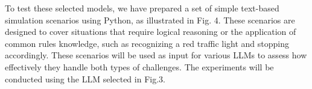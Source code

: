 \documentclass[conference]{IEEEtran}
\begin{document}
To test these selected models, we have prepared a set of simple text-based simulation scenarios using Python, as illustrated in Fig. 4. These scenarios are designed to cover situations that require logical reasoning or the application of common rules knowledge, such as recognizing a red traffic light and stopping accordingly. These scenarios will be used as input for various LLMs to assess how effectively they handle both types of challenges. The experiments will be conducted using the LLM selected in Fig.3. 









\end{document}

